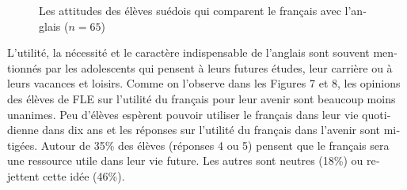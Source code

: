 \documentclass[french, output=paper]{langscibook}
\begin{document}
\begin{otherlanguage}{french}
\begin{figure}
\caption{\label{fig:granfeldt:6}Les attitudes des élèves suédois qui comparent le français avec l’anglais ($n=65$)}
\end{figure}

L’utilité, la nécessité et le caractère indispensable de l’anglais sont souvent mentionnés par les adolescents qui pensent à leurs futures études, leur carrière ou à leurs vacances et loisirs. Comme on l’observe dans les Figures 7 et 8, les opinions des élèves de FLE sur l’utilité du français pour leur avenir sont beaucoup moins unanimes. Peu d’élèves espèrent pouvoir utiliser le français dans leur vie quotidienne dans dix ans et les réponses sur l’utilité du français dans l’avenir sont mitigées. Autour de 35\% des élèves (réponses 4 ou 5) pensent que le français sera une ressource utile dans leur vie future. Les autres sont neutres (18\%) ou rejettent cette idée (46\%).


\end{otherlanguage}
\end{document}
